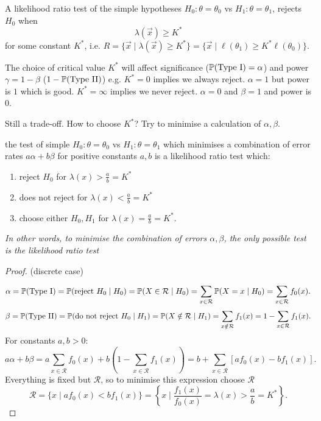 \documentclass[10pt, a4paper]{article}
\begin{document}
\begin{definition}
    A likelihood ratio test of the simple hypotheses $H_0 : \theta = \theta_0$ vs $H_1 : \theta = \theta_1$,
    rejects $H_0$ when
    \[
    \lambda(\vec{x}) \geq K ^ {*}
    \]
    for some constant $K ^ {*}$,
    i.e. $R = \{\vec{x} \mid \lambda(\vec{x}) \geq K ^ {*}\} = \{\vec{x} \mid \ell(\theta_1) \geq K ^ {*}\ell(\theta_0)\}$.
\end{definition}

The choice of critical value $K ^ {*}$ will affect significance
($\P(\text{Type I}) = \alpha$)
and power $\gamma = 1 - \beta$
($1 - \P(\text{Type II})$)
e.g. $K ^ {*} = 0$ implies we always reject.
$\alpha = 1$ but power is $1$ which is good.
$K ^ {*} = \infty$ implies we never reject.
$\alpha = 0$ and $\beta = 1$ and power is $0$.

Still a trade-off.
How to choose $K ^ {*}$?
Try to minimise a calculation of $\alpha, \beta$.

\begin{proposition}
    the test of simple $H_0 : \theta = \theta_0$ vs $H_1 : \theta = \theta_1$ which minimises a combination of error rates $a\alpha + b\beta$ for positive constants $a, b$ is a likelihood ratio test which:
    \begin{enumerate}[label = (\roman*)]
        \item reject $H_0$ for $\lambda(x) > \frac{a}{b} = K ^ {*}$

        \item does not reject for $\lambda(x) < \frac{a}{b} = K ^ {*}$

        \item choose either $H_0, H_1$ for $\lambda(x) = \frac{a}{b} = K ^ {*}$.
    \end{enumerate}

    \textit{In other words,
    to minimise the combination of errors $\alpha, \beta$,
    the only possible test is the likelihood ratio test}

    \begin{proof}(discrete case)

    \[
    \alpha = \P(\text{Type I}) = \P(\text{reject } H_0 \mid H_0) = \P(X \in \mathcal{R} \mid H_0) = \sum_{x \in \mathcal{R}}\P(X = x\mid H_0) = \sum_{x \in \mathcal{R}}f_0(x).
    \]
    \[
    \beta = \P(\text{Type II}) = \P(\text{do not reject } H_0 \mid H_1) = \P(X \notin \mathcal{R} \mid H_1) = \sum_{x \notin \mathcal{R}}f_1(x) = 1 - \sum_{x \in \mathcal{R}}f_1(x).
    \]
    For constants $a, b > 0$:
    \[
    a\alpha + b\beta = a\sum_{x \in \mathcal{R}}f_0(x) + b\left(1 - \sum_{x \in \mathcal{R}}f_1(x)\right) = b + \sum_{x \in \mathcal{R}}\left[af_0(x) - bf_1(x)\right].
    \]
    Everything is fixed but $\mathcal{R}$,
    so to minimise this expression choose $\mathcal{R}$
    \[
    \mathcal{R} = \{x \mid af_0(x) < bf_1(x)\} = \left\{x \mid \frac{f_1(x)}{f_0(x)} = \lambda(x) > \frac{a}{b} = K ^ {*}\right\}.
    \]
    \end{proof}
\end{proposition}
\end{document}
